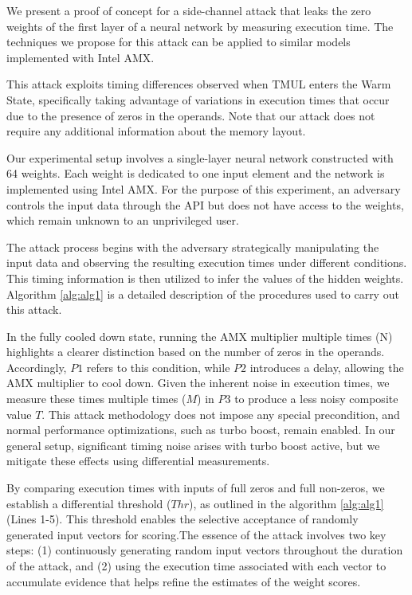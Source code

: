 \label{sec:ML_Network}
We present a proof of concept for a side-channel attack that leaks the zero weights of the first layer of a neural network by measuring execution time. The techniques we propose for this attack can be applied to similar models implemented with Intel AMX. 

This attack exploits timing differences observed when TMUL enters the Warm State, specifically taking advantage of variations in execution times that occur due to the presence of zeros in the operands. Note that our attack does not require any additional information about the memory layout.


Our experimental setup involves a single-layer neural network constructed with 64 weights. Each weight is dedicated to one input element and the network is implemented using Intel AMX. For the purpose of this experiment, an adversary controls the input data through the API but does not have access to the weights, which remain unknown to an unprivileged user.



The attack process begins with the adversary strategically manipulating the input data and observing the resulting execution times under different conditions. This timing information is then utilized to infer the values of the hidden weights. Algorithm \ref{alg:alg1} is a detailed description of the procedures used to carry out this attack.

In the fully cooled down state, running the AMX multiplier multiple times (N) highlights a clearer distinction based on the number of zeros in the operands. Accordingly, \(P1\) refers to this condition, while \(P2\) introduces a delay, allowing the AMX multiplier to cool down. Given the inherent noise in execution times, we measure these times multiple times (\(M\)) in \(P3\) to produce a less noisy composite value \(T\). This attack methodology does not impose any special precondition, and normal performance optimizations, such as turbo boost, remain enabled. In our general setup, significant timing noise arises with turbo boost active, but we mitigate these effects using differential measurements.

By comparing execution times with inputs of full zeros and full non-zeros, we establish a differential threshold (\(Thr\)), as outlined in the algorithm \ref{alg:alg1} (Lines 1-5). This threshold enables the selective acceptance of randomly generated input vectors for scoring.The essence of the attack involves two key steps: (1) continuously generating random input vectors throughout the duration of the attack, and (2) using the execution time associated with each vector to accumulate evidence that helps refine the estimates of the weight scores.

